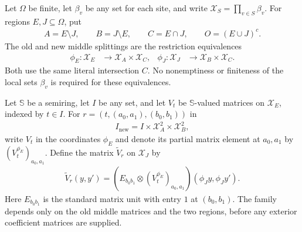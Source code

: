 \begin{definition}
    \label{def:regional_middle_configuration_splittings}
    \leanok
    Let $\Omega$ be finite, let $\beta_v$ be any set for each site, and write
    $\mathcal X_S=\prod_{v\in S}\beta_v$. For regions $E,J\subseteq\Omega$, put
    \begin{align}
        A=E\setminus J,\qquad B=J\setminus E,\qquad
        C=E\cap J,\qquad O=(E\cup J)^c.
        \label{eq:regional_middle_four_regions}
    \end{align}
    The old and new middle splittings are the restriction equivalences
    \begin{align}
        \phi_E:\mathcal X_E & \longrightarrow\mathcal X_A\times\mathcal X_C, &
        \phi_J:\mathcal X_J & \longrightarrow\mathcal X_B\times\mathcal X_C.
        \label{eq:regional_middle_configuration_splittings}
    \end{align}
    Both use the same literal intersection $C$. No nonemptiness or finiteness
    of the local sets $\beta_v$ is required for these equivalences.
\end{definition}

\begin{definition}
    \label{def:regional_middle_transferred_family}
    \leanok
    Let $\mathbb S$ be a semiring, let $I$ be any set, and let $V_t$ be
    $\mathbb S$-valued matrices on $\mathcal X_E$, indexed by $t\in I$.
    For $r=(t,(a_0,a_1),(b_0,b_1))$ in
    \begin{align}
        I_{\mathrm{new}}=I\times\mathcal X_A^2\times\mathcal X_B^2,
        \label{eq:regional_middle_new_index}
    \end{align}
    write $V_t$ in the coordinates $\phi_E$ and denote its partial matrix
    element at $a_0,a_1$ by $(V_t^{\phi_E})_{a_0,a_1}$.
    Define the matrix $\widetilde V_r$ on $\mathcal X_J$ by
    \begin{align}
        \widetilde V_r(y,y')=
        \left(E_{b_0b_1}\otimes (V_t^{\phi_E})_{a_0,a_1}\right)
        (\phi_J y,\phi_J y').
        \label{eq:regional_middle_transferred_family}
    \end{align}
    Here $E_{b_0b_1}$ is the standard matrix unit with entry $1$ at $(b_0,b_1)$.
    The family depends only on the old middle matrices and the two regions,
    before any exterior coefficient matrices are supplied.
\end{definition}


